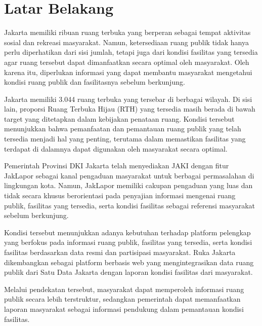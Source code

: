 \documentclass[conference]{IEEEtran}
\begin{document}
\section{Latar Belakang}

Jakarta memiliki ribuan ruang terbuka yang berperan sebagai tempat aktivitas sosial dan rekreasi masyarakat. Namun, ketersediaan ruang publik tidak hanya perlu diperhatikan dari sisi jumlah, tetapi juga dari kondisi fasilitas yang tersedia agar ruang tersebut dapat dimanfaatkan secara optimal oleh masyarakat. Oleh karena itu, diperlukan informasi yang dapat membantu masyarakat mengetahui kondisi ruang publik dan fasilitasnya sebelum berkunjung.

Jakarta memiliki 3.044 ruang terbuka yang tersebar di berbagai wilayah. Di sisi lain, proporsi Ruang Terbuka Hijau (RTH) yang tersedia masih berada di bawah target yang ditetapkan dalam kebijakan penataan ruang. Kondisi tersebut menunjukkan bahwa pemanfaatan dan pemantauan ruang publik yang telah tersedia menjadi hal yang penting, terutama dalam memastikan fasilitas yang terdapat di dalamnya dapat digunakan oleh masyarakat secara optimal.

Pemerintah Provinsi DKI Jakarta telah menyediakan JAKI dengan fitur JakLapor sebagai kanal pengaduan masyarakat untuk berbagai permasalahan di lingkungan kota. Namun, JakLapor memiliki cakupan pengaduan yang luas dan tidak secara khusus berorientasi pada penyajian informasi mengenai ruang publik, fasilitas yang tersedia, serta kondisi fasilitas sebagai referensi masyarakat sebelum berkunjung.

Kondisi tersebut menunjukkan adanya kebutuhan terhadap platform pelengkap yang berfokus pada informasi ruang publik, fasilitas yang tersedia, serta kondisi fasilitas berdasarkan data resmi dan partisipasi masyarakat. Ruka Jakarta dikembangkan sebagai platform berbasis web yang mengintegrasikan data ruang publik dari Satu Data Jakarta dengan laporan kondisi fasilitas dari masyarakat.

Melalui pendekatan tersebut, masyarakat dapat memperoleh informasi ruang publik secara lebih terstruktur, sedangkan pemerintah dapat memanfaatkan laporan masyarakat sebagai informasi pendukung dalam pemantauan kondisi fasilitas.
\end{document}
